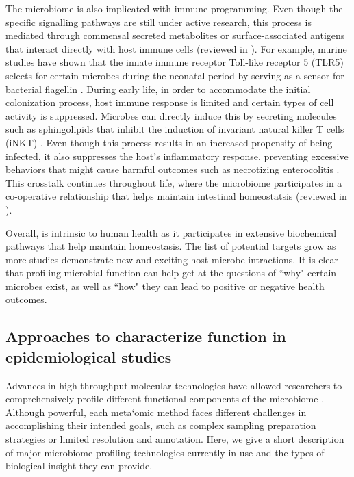 The microbiome is also implicated with immune programming. Even though the specific signalling pathways are still under active research, this process is mediated through commensal secreted metabolites or surface-associated antigens that interact directly with host immune cells (reviewed in \cite{belkaid2014role}). For example, murine studies have shown that the innate immune receptor Toll-like receptor 5 (TLR5) selects for certain microbes during the neonatal period by serving as a sensor for bacterial flagellin \cite{fulde2018neonatal}. During early life, in order to accommodate the initial colonization process, host immune response is limited and certain types of cell activity is suppressed. Microbes can directly induce this by secreting molecules such as sphingolipids that inhibit the induction of invariant natural killer T cells (iNKT) \cite{an2014sphingolipids}. Even though this process results in an increased propensity of being infected, it also suppresses the host's inflammatory response, preventing excessive behaviors that might cause harmful outcomes such as necrotizing enterocolitis \cite{neu2011necrotizing}. This crosstalk continues throughout life, where the microbiome participates in a co-operative relationship that helps maintain intestinal homeostatsis (reviewed in \cite{zheng2020interaction}). 

Overall, is intrinsic to human health as it participates in extensive biochemical pathways that help maintain homeostasis. The list of potential targets grow as more studies demonstrate new and exciting host-microbe intractions. It is clear that profiling microbial function can help get at the questions of ``why" certain microbes exist, as well as ``how" they can lead to positive or negative health outcomes.  

\subsection{Approaches to characterize function in epidemiological studies}

Advances in high-throughput molecular technologies have allowed researchers to comprehensively profile different functional components of the microbiome \cite{foxman2015use}. Although powerful, each meta`omic method faces different challenges in accomplishing their intended goals, such as complex sampling preparation strategies or limited resolution and annotation. Here, we give a short description of major microbiome profiling technologies currently in use and the types of biological insight they can provide.  

